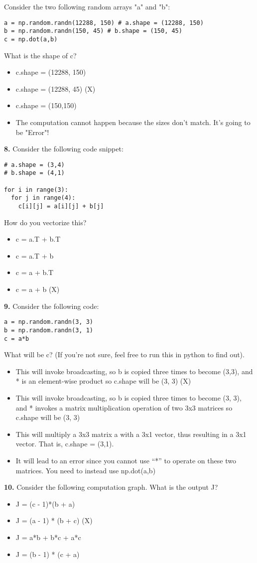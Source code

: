 Consider the two following random arrays "a" and "b":
\begin{lstlisting}
a = np.random.randn(12288, 150) # a.shape = (12288, 150)
b = np.random.randn(150, 45) # b.shape = (150, 45)
c = np.dot(a,b)
\end{lstlisting}
What is the shape of c?
\begin{itemize}
    \item c.shape = (12288, 150)
    \item c.shape = (12288, 45) (X)
    \item c.shape = (150,150)
    \item The computation cannot happen because the sizes don't match. It's going to be "Error"!
\end{itemize}
\textbf{8.} Consider the following code snippet:
\begin{lstlisting}
# a.shape = (3,4)
# b.shape = (4,1)

for i in range(3):
  for j in range(4):
    c[i][j] = a[i][j] + b[j]
\end{lstlisting}
How do you vectorize this?
\begin{itemize}
    \item c = a.T + b.T
    \item c = a.T + b
    \item c = a + b.T
    \item c = a + b (X)
\end{itemize}
\textbf{9.} Consider the following code:
\begin{lstlisting}
a = np.random.randn(3, 3)
b = np.random.randn(3, 1)
c = a*b
\end{lstlisting}
What will be c? (If you’re not sure, feel free to run this in python to find out).
\begin{itemize}
    \item This will invoke broadcasting, so b is copied three times to become (3,3), and * is an element-wise product so c.shape will be (3, 3) (X)
    \item This will invoke broadcasting, so b is copied three times to become (3, 3), and * invokes a matrix multiplication operation of two 3x3 matrices so c.shape will be (3, 3)
    \item This will multiply a 3x3 matrix a with a 3x1 vector, thus resulting in a 3x1 vector. That is, c.shape = (3,1).
    \item It will lead to an error since you cannot use “*” to operate on these two matrices. You need to instead use np.dot(a,b)
\end{itemize}
\textbf{10.} Consider the following computation graph.
What is the output J?
\begin{itemize}
    \item J = (c - 1)*(b + a)
    \item J = (a - 1) * (b + c) (X)
    \item J = a*b + b*c + a*c
    \item J = (b - 1) * (c + a)
\end{itemize}